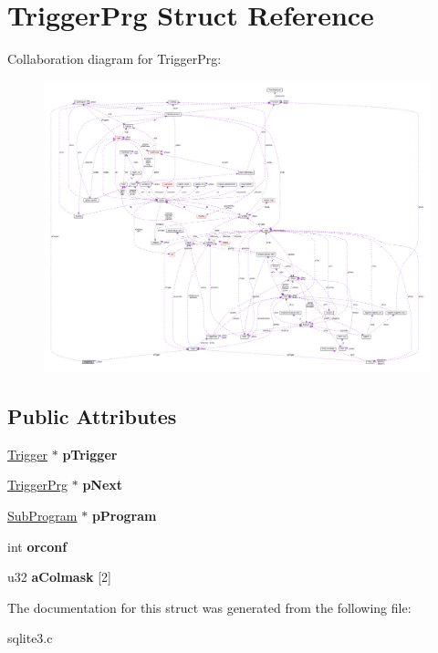 \hypertarget{structTriggerPrg}{}\section{Trigger\+Prg Struct Reference}
\label{structTriggerPrg}


Collaboration diagram for Trigger\+Prg\+:\nopagebreak
\begin{figure}[H]
\begin{center}
\leavevmode
\includegraphics[width=350pt]{structTriggerPrg__coll__graph}
\end{center}
\end{figure}
\subsection*{Public Attributes}
\begin{DoxyCompactItemize}
\item 
\hyperlink{structTrigger}{Trigger} $\ast$ {\bfseries p\+Trigger}\hypertarget{structTriggerPrg_af70e5a74c954bc7a1eb8ee1162c40368}{}\label{structTriggerPrg_af70e5a74c954bc7a1eb8ee1162c40368}

\item 
\hyperlink{structTriggerPrg}{Trigger\+Prg} $\ast$ {\bfseries p\+Next}\hypertarget{structTriggerPrg_a551b8a29a8c4ff785afab1596e5d8710}{}\label{structTriggerPrg_a551b8a29a8c4ff785afab1596e5d8710}

\item 
\hyperlink{structSubProgram}{Sub\+Program} $\ast$ {\bfseries p\+Program}\hypertarget{structTriggerPrg_aa770aee270c7c5df85578dc4a6686134}{}\label{structTriggerPrg_aa770aee270c7c5df85578dc4a6686134}

\item 
int {\bfseries orconf}\hypertarget{structTriggerPrg_aa475acda58c472b3491f6aa17020bf68}{}\label{structTriggerPrg_aa475acda58c472b3491f6aa17020bf68}

\item 
u32 {\bfseries a\+Colmask} \mbox{[}2\mbox{]}\hypertarget{structTriggerPrg_aeac0a4cd1f1d287981ae33c4d171b614}{}\label{structTriggerPrg_aeac0a4cd1f1d287981ae33c4d171b614}

\end{DoxyCompactItemize}


The documentation for this struct was generated from the following file\+:\begin{DoxyCompactItemize}
\item 
sqlite3.\+c\end{DoxyCompactItemize}
